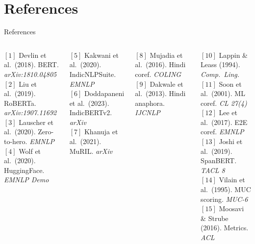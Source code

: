 \documentclass[aspectratio=169]{beamer}
\begin{document}
\section{References}

\begin{frame}{References}
  \begin{columns}[T]
      \begin{tcolorbox}[gbox={Language Models \& Tools}]
        \scriptsize
        $[1]$ Devlin et al.\ (2018). BERT. \textit{arXiv:1810.04805}\\
        $[2]$ Liu et al.\ (2019). RoBERTa. \textit{arXiv:1907.11692}\\
        $[3]$ Lauscher et al.\ (2020). Zero-to-hero. \textit{EMNLP}\\
        $[4]$ Wolf et al.\ (2020). HuggingFace. \textit{EMNLP Demo}
      \end{tcolorbox}

      \vspace{5pt}
      \begin{tcolorbox}[gbox={Indic Language Models}]
        \scriptsize
        $[5]$ Kakwani et al.\ (2020). IndicNLPSuite. \textit{EMNLP}\\
        $[6]$ Doddapaneni et al.\ (2023). IndicBERTv2. \textit{arXiv}\\
        $[7]$ Khanuja et al.\ (2021). MuRIL. \textit{arXiv}
      \end{tcolorbox}

      \vspace{5pt}
      \begin{tcolorbox}[gbox={Hindi NLP}]
        \scriptsize
        $[8]$ Mujadia et al.\ (2016). Hindi coref. \textit{COLING}\\
        $[9]$ Dakwale et al.\ (2013). Hindi anaphora. \textit{IJCNLP}
      \end{tcolorbox}

      \begin{tcolorbox}[gbox={Coreference Systems}]
        \scriptsize
        $[10]$ Lappin \& Leass (1994). \textit{Comp.\ Ling.}\\
        $[11]$ Soon et al.\ (2001). ML coref. \textit{CL 27(4)}\\
        $[12]$ Lee et al.\ (2017). E2E coref. \textit{EMNLP}\\
        $[13]$ Joshi et al.\ (2019). SpanBERT. \textit{TACL 8}\\
        $[14]$ Vilain et al.\ (1995). MUC scoring. \textit{MUC-6}\\
        $[15]$ Moosavi \& Strube (2016). Metrics. \textit{ACL}
      \end{tcolorbox}


\end{columns}
\end{frame}
\end{document}
